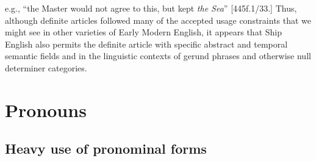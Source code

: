 e.g., “the Master would not agree to this, but kept \textit{the Sea}” [445f.1/33.] Thus, although definite articles followed many of the accepted usage constraints that we might see in other varieties of Early Modern English, it appears that Ship English also permits the definite article with specific abstract and temporal semantic fields and in the linguistic contexts of gerund phrases and otherwise null determiner categories. 

\section{{Pronouns}}%

\subsection{{Heavy} {use} {of} {pronominal} {forms}}%

